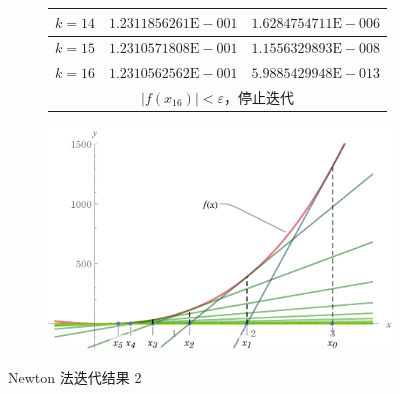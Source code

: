 \documentclass[11pt]{article}
\begin{document}
\begin{figure}
\begin{subfigure}{.49\textwidth}
{\begin{tabular}{|l|c|c|}
                \hline $k = 14$        & $1.2311856261\text{E}{-}001$ & $1.6284754711\text{E}{-}006$ \\
                \hline $k = 15$        & $1.2310571808\text{E}{-}001$ & $1.1556329893\text{E}{-}008$ \\
                \hline $k = 16$        & $1.2310562562\text{E}{-}001$ & $5.9885429948\text{E}{-}013$ \\
                \hline \multicolumn{3}{|c|}{$|f(x_{16})| < \varepsilon$，停止迭代}                   \\
                \hline
            \end{tabular}
        }
        \label{table:Newton2}
    \end{subfigure}
    \begin{subfigure}{.49\textwidth}
        \centering
        \includegraphics[scale = 0.5]{Figure/Newton2.pdf}
        \label{figure:Newton2}
    \end{subfigure}
    \caption{Newton 法迭代结果 2 }
    \label{Newton2}
\end{figure}
\end{document}
